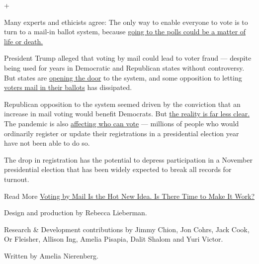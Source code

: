 +

Many experts and ethicists agree: The only way to enable everyone to
vote is to turn to a mail-in ballot system, because
\href{https://www.nytimes3xbfgragh.onion/2020/05/05/magazine/voting-by-mail-2020-covid.html}{going
to the polls could be a matter of life or death.}

President Trump alleged that voting by mail could lead to voter fraud
--- despite being used for years in Democratic and Republican states
without controversy. But states are
\href{https://www.nytimes3xbfgragh.onion/2020/05/21/us/vote-by-mail-trump.html}{opening
the door} to the system, and some opposition to letting
\href{https://www.nytimes3xbfgragh.onion/2020/06/10/us/politics/voting-by-mail-georgia.html}{voters
mail in their ballots} has dissipated.

Republican opposition to the system seemed driven by the conviction that
an increase in mail voting would benefit Democrats. But
\href{https://www.nytimes3xbfgragh.onion/2020/05/25/us/vote-by-mail-coronavirus.html}{the
reality is far less clear.} The pandemic is also
\href{https://www.nytimes3xbfgragh.onion/2020/06/14/us/voter-registration-coronavirus-2020-election.html}{affecting
who can vote} --- millions of people who would ordinarily register or
update their registrations in a presidential election year have not been
able to do so.

The drop in registration has the potential to depress participation in a
November presidential election that has been widely expected to break
all records for turnout.

 Read More
\href{https://www.nytimes3xbfgragh.onion/2020/03/19/us/politics/voting-by-mail-coronavirus.html}{Voting
by Mail Is the Hot New Idea. Is There Time to Make It Work?}

Design and production by Rebecca Lieberman.

Research \& Development contributions by Jimmy Chion, Jon Cohrs, Jack
Cook, Or Fleisher, Allison Ing, Amelia Pisapia, Dalit Shalom and Yuri
Victor.

Written by Amelia Nierenberg.

